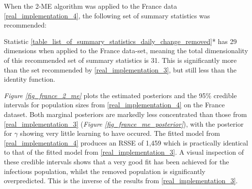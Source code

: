 \documentclass[11pt,a4paper]{article}
\theoremstyle{break}
\begin{document}
    When the 2-ME algorithm was applied to the France data \noindent\ref{real_implementation_4}, the following set of summary statistics was recommended:

  \begin{center}
  \end{center}
  \noindent Statistic \ref{table_list_of_summary_statistics_daily_change_removed}* has 29 dimensions when applied to the France data-set, meaning the total dimensionality of this recommended set of summary statistics is 31. This is significantly more than the set recommended by \ref{real_implementation_3}, but still less than the identity function.

  \par \textit{Figure \ref{fig_france_2_me}} plots the estimated posteriors and the 95\% credible intervals for population sizes from \ref{real_implementation_4} on the France dataset. Both marginal posteriors are markedly less concentrated than those from \ref{real_implementation_3} (\textit{Figure \ref{fig_france_me_posterior}}), with the posterior for $\gamma$ showing very little learning to have occured. The fitted model from \ref{real_implementation_4} produces an RSSE of 1,459 which is practically identical to that of the fitted model from \ref{real_implementation_3}. A visual inspection of these credible intervals shows that a very good fit has been achieved for the infectious population, whilst the removed population is significantly overpredicted. This is the inverse of the results from \ref{real_implementation_3}.
\end{document}
